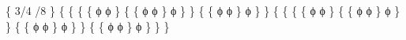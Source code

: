  \{  3/4  /8  \} 
 \{   \{   \{   \{  ϕ  \mid  ϕ  \}   \mid   \{   \{  ϕ  \mid  ϕ  \}   \mid  ϕ  \}   \}   \mid   \{   \{  ϕ  \mid  ϕ  \}   \mid  ϕ  \}   \}   \mid   \{   \{   \{   \{  ϕ  \mid  ϕ  \}   \mid   \{   \{  ϕ  \mid  ϕ  \}   \mid  ϕ  \}   \}   \mid   \{   \{  ϕ  \mid  ϕ  \}   \mid  ϕ  \}   \}   \mid   \{   \{  ϕ  \mid  ϕ  \}   \mid  ϕ  \}   \}   \} 

